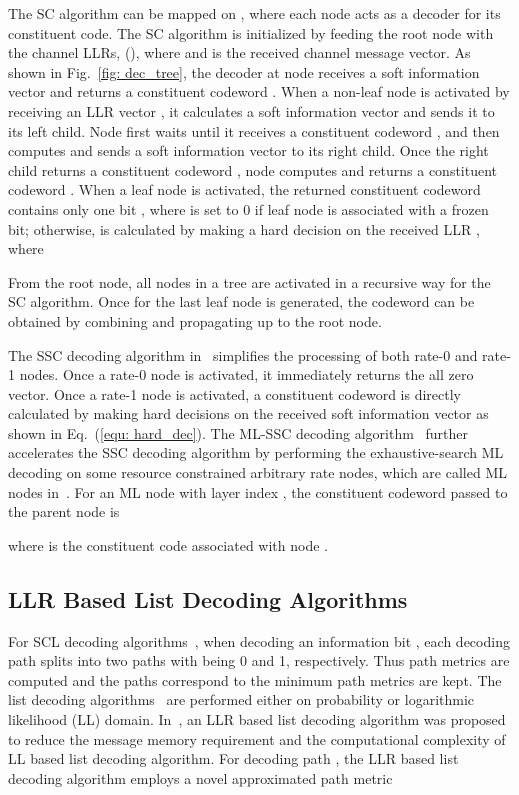 \documentclass[journal]{IEEEtran}
\begin{document}
The SC algorithm can be mapped on , where each node acts as a decoder for its constituent code. The SC algorithm is initialized by feeding the root node with the channel LLRs, (), where  and  is the received channel message vector. As shown in Fig.~\ref{fig: dec_tree}, the decoder at node  receives a soft information vector  and returns a constituent codeword . When a non-leaf node  is activated by receiving an LLR vector , it calculates a soft information vector  and sends it to its left child.
Node  first waits until it receives a constituent codeword , and then computes and sends a soft information vector  to its right child.
Once the right child returns a constituent codeword , node  computes and returns a constituent codeword .
When a leaf node  is activated, the returned constituent codeword  contains only one bit , where  is set to 0 if leaf node  is associated with a frozen bit; otherwise,  is calculated by making a hard decision on the received LLR , where

From the root node, all nodes in a tree are activated in a recursive way for the SC algorithm. Once  for the last leaf node is generated, the codeword  can be obtained by combining and propagating  up to the root node.

The SSC decoding algorithm in~\cite{low_latency_polar} simplifies the processing of both rate-0 and rate-1 nodes. Once a rate-0 node is activated, it immediately returns the all zero vector. Once a rate-1 node is activated, a constituent codeword is directly calculated by making hard decisions on the received soft information vector as shown in Eq.~(\ref{equ: hard_dec}). The ML-SSC decoding algorithm~\cite{ml_ssc} further accelerates the SSC decoding algorithm by performing the exhaustive-search ML decoding on some resource constrained arbitrary rate nodes, which are called ML nodes in~\cite{ml_ssc}. For an ML node with layer index , the constituent codeword passed to the parent node  is

where  is the constituent code associated with node .

\subsection{LLR Based List Decoding Algorithms} \label{ssec: llr_based}
For SCL decoding algorithms~\cite{ido_it, tree_list_dec, llr_list}, when decoding an information bit , each decoding path splits into two paths with  being 0 and 1, respectively. Thus  path metrics are computed and the  paths correspond to the  minimum path metrics are kept.
The list decoding algorithms~\cite{ido_it, tree_list_dec} are performed either on probability or logarithmic likelihood (LL) domain. In~\cite{llr_list}, an LLR based list decoding algorithm was proposed to reduce the message memory requirement and the computational complexity of LL based list decoding algorithm. For decoding path  , the LLR based list decoding algorithm employs a novel approximated path metric
\end{document}
